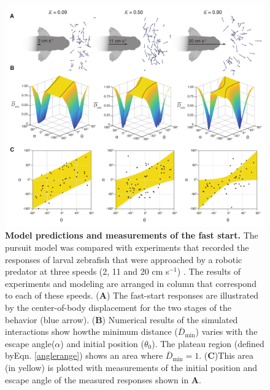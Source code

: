 \documentclass[12pt]{article}
\newcommand{\ol}{\overline}
\begin{document}
\pagebreak
\begin{figure}[t]
\begin{centering}
\includegraphics[width=1\textwidth]{Fig_03.pdf}
\centering	
\caption{
\textbf{Model predictions and measurements of the fast start.} 
The pursuit model was compared with experiments that recorded the responses of larval zebrafish that were approached by a robotic predator at three speeds (2, 11 and 20 cm s$^{-1}$) \citep{Stewart:2014cm}. The results of experiments and modeling are arranged in column that correspond to each of these speeds.
(\textbf{A}) The fast-start responses are illustrated by the center-of-body displacement for the two stages of the behavior (blue arrow). 
(\textbf{B}) Numerical results of the simulated interactions show howthe minimum distance  ($\ol D_{\text{min}}$)  varies with the escape angle($\alpha$) and initial position ($\theta_0$). The plateau region (defined byEqn. \ref{anglerange}) shows an area where $\ol D_{\text{min}}=1$. 
(\textbf{C})This area (in yellow) is plotted with measurements of the initial position and escape angle of the measured responses shown in \textbf{A}.
}
\label{our_topo}
\end{centering}
\end{figure}
\end{document}
